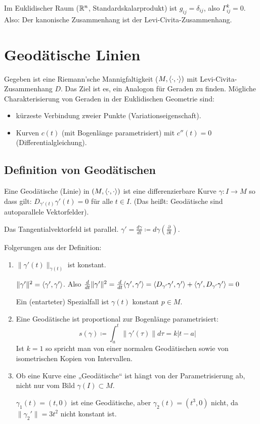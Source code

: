 \documentclass[a4paper,twoside,DIV15,BCOR12mm]{scrbook}
\renewcommand{\da}{\coloneqq}
\begin{document}
\begin{beispiel}
Im Euklidischer Raum ($\mathbb{R}^n$, Standardskalarprodukt) ist $g_{ij}=\delta_{ij}$, also $\Gamma_{ij}^k = 0$. Also: Der kanonische Zusammenhang ist der Levi-Civita-Zusammenhang.
\end{beispiel}

\chapter{Geodätische Linien}

Gegeben ist eine Riemann’sche Mannigfaltigkeit ($M,\langle\cdot,\cdot\rangle)$ mit Levi-Civita-Zusammenhang $D$. Das Ziel ist es, ein Analogon für Geraden zu finden. Mögliche Charakterisierung von Geraden in der Euklidischen Geometrie sind:
\begin{itemize}
\item kürzeste Verbindung zweier Punkte (Variationseigenschaft).
\item Kurven $c(t)$ (mit Bogenlänge parametrisiert) mit $c''(t)=0$ (Differentialgleichung).
\end{itemize}

\section{Definition von Geodätischen}

Eine Geodätische (Linie) in $(M,\langle\cdot,\cdot\rangle)$ ist eine differenzierbare Kurve $\gamma: I \to M$ so dass gilt: $D_{\gamma'(t)}\gamma'(t) = 0$ für alle $t\in I$. (Das heißt: Geodätische sind autoparallele Vektorfelder).

Das Tangentialvektorfeld ist parallel. $\gamma' = \frac {d\gamma}{dt} \da d\gamma(\frac\partial{\partial t})$.

Folgerungen aus der Definition:
\begin{enumerate}
\item $\|\gamma'(t)\|_{\gamma(t)}$ ist konstant.

\begin{beweis}
$\|\gamma'\|^2 = \langle\gamma',\gamma'\rangle$. Also $\frac d{dt} \|\gamma'\|^2 = \frac d{dt} \langle\gamma',\gamma'\rangle = \langle D_{\gamma'}\gamma',\gamma'\rangle + \langle\gamma',D_{\gamma'}\gamma'\rangle = 0$
\end{beweis}
Ein (entarteter) Spezialfall ist $\gamma(t)$ konstant $p\in M$.
\item Eine Geodätische ist proportional zur Bogenlänge parametrisiert:
\[
s(\gamma) \da \int_a^t \|\gamma'(\tau)\| d\tau = k |t-a|
\]
Ist $k=1$ so spricht man von einer normalen Geodätischen sowie von isometrischen Kopien von Intervallen.
\item Ob eine Kurve eine „Geodätische“ ist hängt von der Parametrisierung ab, nicht nur vom Bild $\gamma(I)\subset M$.
\begin{beispiel}
$\gamma_1(t) = (t,0)$ ist eine Geodätische, aber $\gamma_2(t) = (t^3,0)$ nicht, da $\|\gamma_2'\|=3t^2$ nicht konstant ist.
\end{beispiel}
\end{enumerate}
\end{document}
